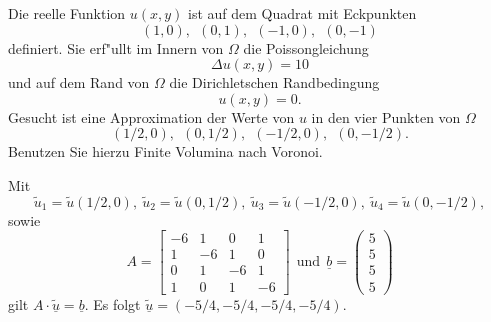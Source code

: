 Die reelle Funktion $u(x,y)$ ist auf dem Quadrat mit Eckpunkten
\[
(1,0), \ \  (0,1), \ \ (-1,0), \ \  (0,-1)
\]
definiert. Sie erf"ullt im Innern von $\Omega$ die Poissongleichung
\[\Delta u(x,y) = 10
\]
und auf dem Rand von $\Omega$ die Dirichletschen Randbedingung
\[
u(x,y) = 0.
\]
Gesucht ist eine Approximation der Werte von $u$ in den vier Punkten von $\Omega$
\[
(1/2,0), \ \  (0,1/2), \ \ (-1/2,0), \ \  (0,-1/2).
\]
Benutzen Sie hierzu Finite Volumina nach Voronoi.  

\begin{loesung}
Mit
\[
\tilde u_1 = \tilde u(1/2,0), \ \tilde u_2 = \tilde u(0,1/2), \ \tilde u_3 = \tilde u(-1/2,0), \ \tilde u_4 = \tilde u(0,-1/2),
\]
sowie
\[
A = \left[\begin{array}{rrrr} -6 & 1 & 0 & 1 \\ 1 & -6 & 1 & 0 \\ 0 & 1 & -6 & 1 \\ 1 & 0 & 1 & -6  \end{array}\right] \ \ \text{und} \ \
  \underline{b} =  \left(\begin{array}{r} 5 \\ 5 \\ 5 \\ 5 \end{array}\right)
\]
gilt
$A \cdot \underline{\tilde u} = \underline{b}.$
Es folgt $\underline{\tilde u} = (-5/4, -5/4, -5/4, -5/4).$
\end{loesung}

